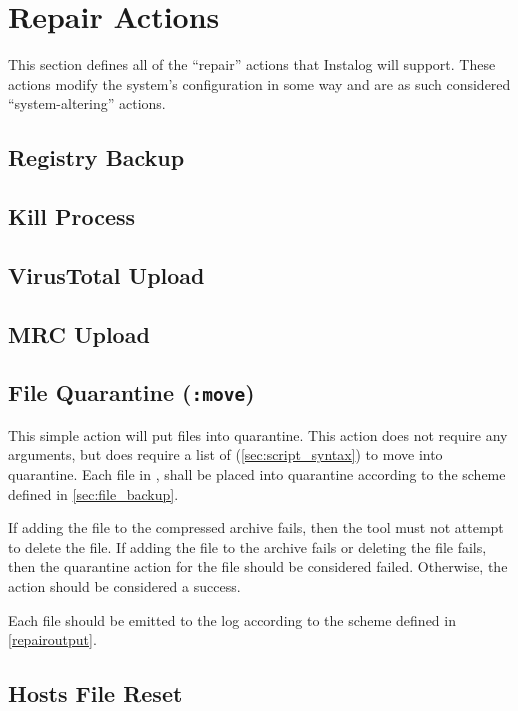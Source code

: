 \section{Repair Actions} \label{sec:repair_actions}
This section defines all of the ``repair'' actions that Instalog will support. 
These actions modify the system's configuration in some way and are as such
considered ``system-altering'' actions. \label{systemaltering}

\subsection{Registry Backup}

\subsection{Kill Process}

\subsection{VirusTotal Upload}

\subsection{MRC Upload}

\subsection{File Quarantine (\texttt{:move})}
This simple action will put files into quarantine.  This action does not require
any arguments, but does require a list of  (\ref{sec:script_syntax})
to move into quarantine.  Each file in , shall be placed into
quarantine according to the scheme defined in \ref{sec:file_backup}.

If adding the file to the compressed archive fails, then the tool must not
attempt to delete the file.  If adding the file to the archive fails or deleting
the file fails, then the quarantine action for the file should be considered
failed.  Otherwise, the action should be considered a success.  

Each file should be emitted to the log according to the scheme defined in
\ref{repairoutput}.

\subsection{Hosts File Reset}


